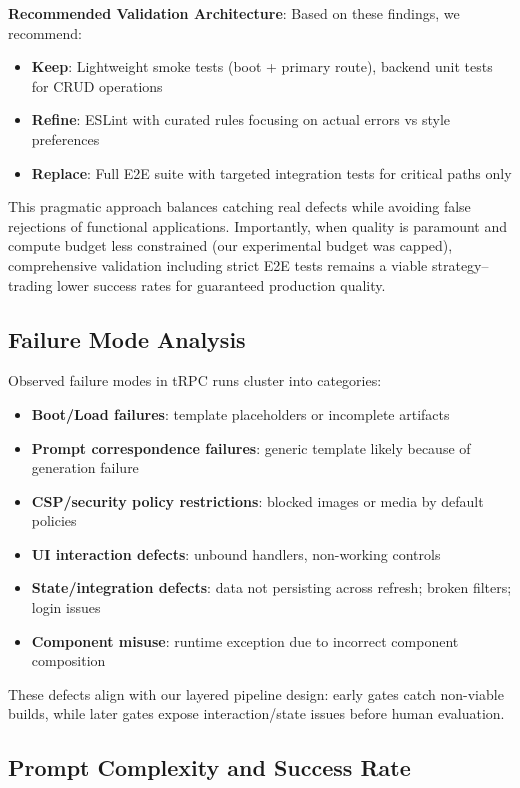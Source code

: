\documentclass{article}
\begin{document}
\textbf{Recommended Validation Architecture}:
Based on these findings, we recommend:
\begin{itemize}
\item \textbf{Keep}: Lightweight smoke tests (boot + primary route), backend unit tests for CRUD operations
\item \textbf{Refine}: ESLint with curated rules focusing on actual errors vs style preferences
\item \textbf{Replace}: Full E2E suite with targeted integration tests for critical paths only
\end{itemize}

This pragmatic approach balances catching real defects while avoiding false rejections of functional applications. Importantly, when quality is paramount and compute budget less constrained (our experimental budget was capped), comprehensive validation including strict E2E tests remains a viable strategy--trading lower success rates for guaranteed production quality.

\subsection{Failure Mode Analysis}

Observed failure modes in tRPC runs cluster into categories:

\begin{itemize}
\item \textbf{Boot/Load failures}: template placeholders or incomplete artifacts
\item \textbf{Prompt correspondence failures}: generic template likely because of generation failure
\item \textbf{CSP/security policy restrictions}: blocked images or media by default policies
\item \textbf{UI interaction defects}: unbound handlers, non-working controls
\item \textbf{State/integration defects}: data not persisting across refresh; broken filters; login issues
\item \textbf{Component misuse}: runtime exception due to incorrect component composition
\end{itemize}

These defects align with our layered pipeline design: early gates catch non-viable builds, while later gates expose interaction/state issues before human evaluation.

\subsection{Prompt Complexity and Success Rate}
\label{sec:prompt-complexity}
\end{document}
